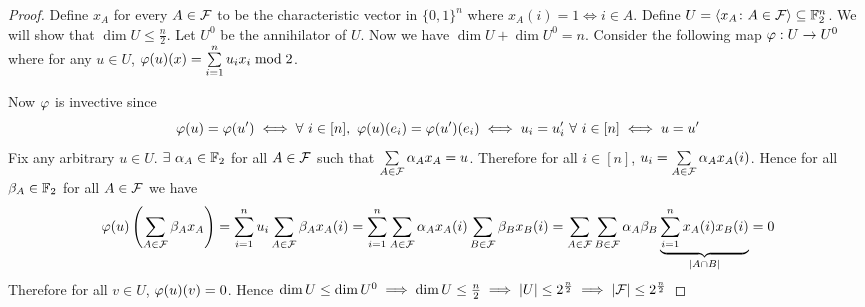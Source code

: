 \documentclass[twoside]{article}
\begin{document}
\begin{proof}
	Define $x_A$ for every $A\in \mathcal{F}$ to be the characteristic vector in $\{0,1\}^n$ where $x_A(i)=1\iff i\in A$. Define $U=\langle x_A\colon A\in\mathcal{F}\rangle\subseteq \mathbb{F}_2^n$. We will show that $\dim U\leq {\frac{n}2}$. Let $U^0$ be the annihilator of $U$. Now we have $\dim U+\dim U^0= n$. Consider the following map $\varphi:U\to U^0$ where for any $u\in U$, $\varphi(u)(x)=\sum\limits_{i=1}^nu_ix_i\bmod 2$. 
	
	Now $\varphi$ is invective since $$\vph(u)=\vph(u')\iff \forall\ i\in[n],\ \vph(u)(e_i)=\vph(u')(e_i)\iff u_i=u'_i\ \forall\ i\in[n]\iff u=u'$$Fix any arbitrary $u\in U$. $\exists\ \alpha_A\in\mathbb{F}_2$ for all $A\in\mathcal{F}$ such that $\sum\limits_{A\in\mathcal{F}}\alpha_Ax_A=u$. Therefore for all $i\in [n]$, $u_i=\sum\limits_{A\in\mathcal{F}}\alpha_Ax_A(i)$.  Hence for all $\beta_A\in \mathbb{F}_2$ for all $A\in\mathcal{F}$ we have $$\varphi(u)\left(\sum_{A\in \mathcal{F}}\beta_Ax_A\right)=\sum_{i=1}^nu_i\sum_{A\in\mathcal{F}}\beta_Ax_A(i)=\sum_{i=1}^n\sum\limits_{A\in\mathcal{F}}\alpha_Ax_A(i)\sum_{B\in\mathcal{F}}\beta_Bx_B(i)=\sum\limits_{A\in\mathcal{F}}\sum_{B\in\mathcal{F}}\alpha_A\beta_B\underbrace{\sum_{i=1}^nx_A(i)x_B(i)}_{|A\cap B|}=0$$Therefore for all $v\in U$, $\varphi(u)(v)=0$. Hence $\dim U\leq \dim U^0\implies \dim U\leq\frac{n}2\implies |U|\leq 2^{\frac{n}2}\implies |\mathcal{F}|\leq 2^{\frac{n}2}$
\end{proof}
\end{document}
